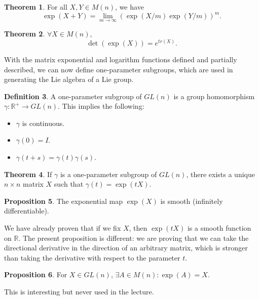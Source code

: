 \documentclass[12pt]{article}
\newcommand{\R}{\mathbb{R}}
\theoremstyle{definition}
\newtheorem{them}{Theorem}
\newtheorem{prop}[them]{Proposition}
\theoremstyle{definition}
\theoremstyle{definition}
\theoremstyle{definition}
\newtheorem{defn}[them]{Definition}
\theoremstyle{definition}
\theoremstyle{definition}
\theoremstyle{definition}
\begin{document}
\begin{them}
    For all $X, Y \in M(n)$, we have
\[
    \exp(X+Y) = \lim_{m\to\infty} (\exp(X/m)\exp(Y/m))^m.
\]
\end{them}

\begin{them} $\forall X \in M(n)$,
\[
    \det(\exp(X)) = e^{tr(X)}.
\]
\end{them}

\vspace{6pt}
\par{With the matrix exponential and logarithm functions defined and partially described, we can now define one-parameter subgroups, which are used in generating the Lie algebra of a Lie group.}
\begin{defn} A one-parameter subgroup
of $GL(n)$ is a group homomorphism $\gamma: \R^{+} \to
GL(n)$. This implies the following: 
\begin{itemize}
    \item $\gamma$ is continuous.
    \item $\gamma(0) = I$.
    \item $\gamma(t+s) = \gamma(t)\gamma(s)$.
\end{itemize}
\end{defn}

\begin{them} If $\gamma$ is a one-parameter
subgroup of $GL(n)$, there exists a unique $n
\times n$ matrix $X$ such that $\gamma(t) = \exp(tX)$.
\end{them}

\begin{prop} The exponential map $\exp(X)$ is smooth
(infinitely differentiable).
\end{prop}
\par{We have already
proven that if we fix $X$, then $\exp(tX)$ is a
smooth function on $\R$. The present proposition
is different: we are proving that we can take the directional
derivative in the direction of an arbitrary
matrix, which is stronger than taking the
derivative with respect to the parameter $t$.}

\begin{prop} For $X \in GL(n)$,
$\exists A \in M(n): \exp(A) = X$.
\end{prop}
\par{This is interesting but
never used in the lecture.}
\end{document}
